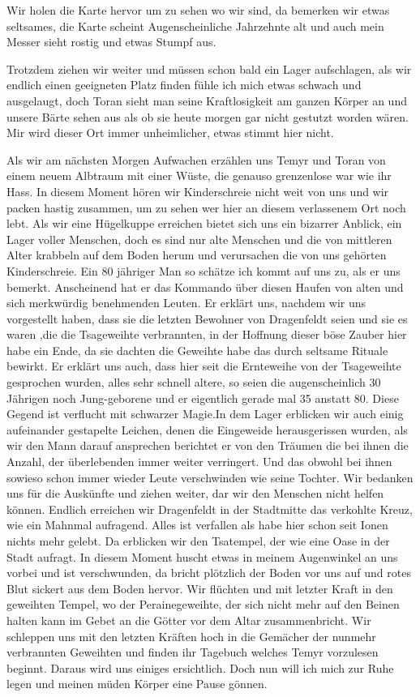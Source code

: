 Wir holen die Karte hervor um zu sehen wo wir sind, da bemerken wir etwas seltsames, die Karte scheint Augenscheinliche Jahrzehnte alt und auch mein Messer sieht rostig und etwas Stumpf aus.

Trotzdem ziehen wir weiter und müssen schon bald ein Lager aufschlagen, als wir endlich einen geeigneten Platz finden fühle ich mich etwas schwach und ausgelaugt, doch Toran sieht man seine Kraftlosigkeit am ganzen Körper an und unsere Bärte sehen aus als ob sie heute morgen gar nicht gestutzt worden wären. Mir wird dieser Ort immer unheimlicher, etwas stimmt hier nicht.

Als wir am nächsten Morgen Aufwachen erzählen uns Temyr und Toran von einem neuem Albtraum mit einer Wüste, die genauso grenzenlose war wie ihr Hass. In diesem Moment hören wir Kinderschreie nicht weit von uns und wir packen hastig zusammen, um zu sehen wer hier an diesem verlassenem Ort noch lebt. Als wir eine Hügelkuppe erreichen bietet sich uns ein bizarrer Anblick, ein Lager voller Menschen, doch es sind nur alte Menschen und die von mittleren Alter
krabbeln auf dem Boden herum und verursachen die von uns gehörten Kinderschreie. Ein 80 jähriger Man so schätze ich kommt auf uns zu, als er uns bemerkt. Anscheinend hat er das Kommando über diesen Haufen von alten und sich merkwürdig benehmenden Leuten. Er erklärt uns, nachdem wir uns vorgestellt haben, dass sie die letzten Bewohner von Dragenfeldt   seien und sie es waren ,die die Tsageweihte verbrannten, in der Hoffnung dieser böse Zauber hier habe ein Ende, da sie dachten die Geweihte habe das durch seltsame Rituale bewirkt. Er erklärt uns auch, dass hier seit die Ernteweihe von der Tsageweihte gesprochen wurden, alles sehr schnell altere, so seien die augenscheinlich 30 Jährigen noch Jung-geborene und er eigentlich gerade mal 35 anstatt 80. Diese Gegend ist verflucht mit schwarzer Magie.In dem Lager erblicken wir auch einig aufeinander gestapelte Leichen, denen die Eingeweide herausgerissen wurden, als wir den Mann darauf ansprechen berichtet er von den Träumen die bei ihnen die Anzahl, der überlebenden immer weiter verringert. Und das obwohl bei ihnen sowieso schon immer wieder Leute verschwinden wie seine Tochter. Wir bedanken uns für die Auskünfte und ziehen weiter, dar wir den Menschen nicht helfen können. Endlich erreichen wir Dragenfeldt  in der Stadtmitte das verkohlte Kreuz, wie ein Mahnmal aufragend. Alles ist verfallen als habe hier schon seit Ionen nichts mehr gelebt. Da erblicken wir den Tsatempel, der wie eine Oase in der Stadt aufragt. In diesem Moment huscht etwas in meinem Augenwinkel an uns vorbei und ist verschwunden, da bricht plötzlich der Boden vor uns auf und rotes Blut sickert aus dem Boden hervor. Wir flüchten und mit letzter Kraft in den geweihten Tempel, wo der Perainegeweihte, der sich nicht mehr auf den Beinen halten kann im Gebet an die Götter vor dem Altar zusammenbricht. Wir schleppen uns mit den letzten Kräften hoch in die Gemächer der nunmehr verbrannten Geweihten und finden ihr Tagebuch welches Temyr vorzulesen beginnt. Daraus wird uns einiges ersichtlich. Doch nun will ich mich zur Ruhe legen und meinen müden Körper eine Pause gönnen.


